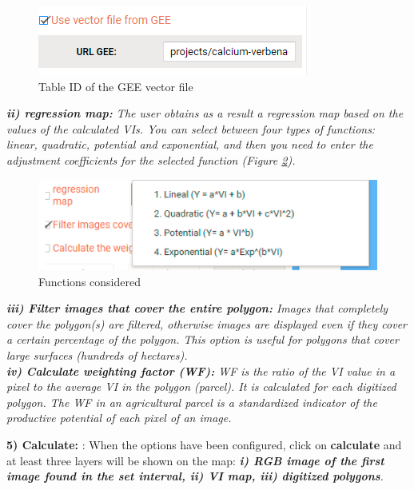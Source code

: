 \documentclass[
]{book}
\begin{document}
\begin{figure}

{\centering \includegraphics{./images/Figure10} 

}

\caption{Table ID of the GEE vector file}\label{fig:figG7}
\end{figure}

\emph{\textbf{ii) regression map:} The user obtains as a result a regression map based on the values of the calculated VIs. You can select between four types of functions: linear, quadratic, potential and exponential, and then you need to enter the adjustment coefficients for the selected function (Figure \ref{fig:figG8}).}

\begin{figure}

{\centering \includegraphics{./images/Figure8} 

}

\caption{Functions considered}\label{fig:figG8}
\end{figure}

\emph{\textbf{iii) Filter images that cover the entire polygon:} Images that completely cover the polygon(s) are filtered, otherwise images are displayed even if they cover a certain percentage of the polygon. This option is useful for polygons that cover large surfaces (hundreds of hectares).}\\
\emph{\textbf{iv) Calculate weighting factor (WF):} WF is the ratio of the VI value in a pixel to the average VI in the polygon (parcel). It is calculated for each digitized polygon. The WF in an agricultural parcel is a standardized indicator of the productive potential of each pixel of an image. }

\textbf{5) Calculate: }: When the options have been configured, click on \textbf{calculate} and at least three layers will be shown on the map: \emph{\textbf{i) RGB image of the first image found in the set interval, ii) VI map, iii) digitized polygons}. }
\end{document}
